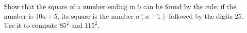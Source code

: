 Show that the square of a number ending in $5$ can be found by the rule: if the number is $10a+5$, its square is the number $a(a+1)$ followed by the digits $25$. Use it to compute $85^2$ and $115^2$.
